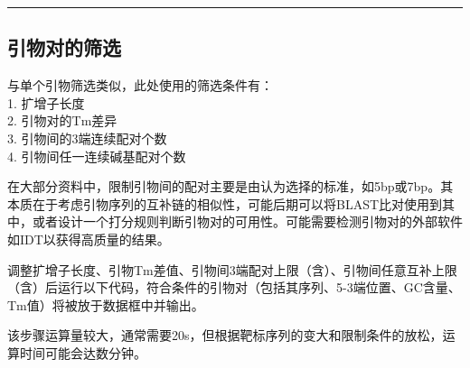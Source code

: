 \documentclass[
]{article}
\begin{document}
\begin{center}\rule{0.5\linewidth}{0.5pt}\end{center}

\hypertarget{ux5f15ux7269ux5bf9ux7684ux7b5bux9009}{%
\subsection{引物对的筛选}\label{ux5f15ux7269ux5bf9ux7684ux7b5bux9009}}

与单个引物筛选类似，此处使用的筛选条件有：\\
1. 扩增子长度\\
2. 引物对的Tm差异\\
3. 引物间的3端连续配对个数\\
4. 引物间任一连续碱基配对个数

在大部分资料中，限制引物间的配对主要是由认为选择的标准，如5bp或7bp。其本质在于考虑引物序列的互补链的相似性，可能后期可以将BLAST比对使用到其中，或者设计一个打分规则判断引物对的可用性。可能需要检测引物对的外部软件如IDT以获得高质量的结果。

调整扩增子长度、引物Tm差值、引物间3端配对上限（含）、引物间任意互补上限（含）后运行以下代码，符合条件的引物对（包括其序列、5-3端位置、GC含量、Tm值）将被放于数据框中并输出。

该步骤运算量较大，通常需要20s，但根据靶标序列的变大和限制条件的放松，运算时间可能会达数分钟。
\end{document}
